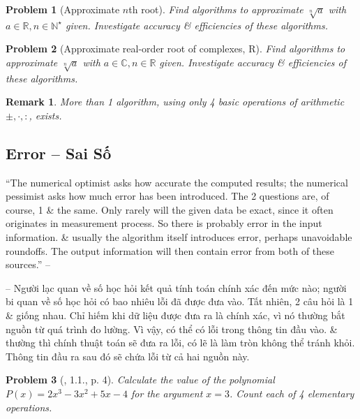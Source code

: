 \documentclass[oneside]{book}
\newtheorem{problem}{Problem}
\newtheorem{remark}{Remark}
\begin{document}
\begin{problem}[Approximate $n$th root]
	Find algorithms to approximate $\sqrt[n]{a}$ with $a\in\mathbb{R},n\in\mathbb{N}^\star$ given. Investigate accuracy \& efficiencies of these algorithms.
\end{problem}

\begin{problem}[Approximate real-order root of complexes, R]
	Find algorithms to approximate $\sqrt[n]{a}$ with $a\in\mathbb{C},n\in\mathbb{R}$ given. Investigate accuracy \& efficiencies of these algorithms.
\end{problem}

\begin{remark}
	More than 1 algorithm, using only 4 basic operations of arithmetic $\pm,\cdot,:$, exists.
\end{remark}


\subsection{Error -- Sai Số}
``The numerical optimist asks how accurate the computed results; the numerical pessimist asks how much error has been introduced. The 2 questions are, of course, 1 \& the same. Only rarely will the given data be exact, since it often originates in measurement process. So there is probably error in the input information. \& usually the algorithm itself introduces error, perhaps unavoidable roundoffs. The output information will then contain error from both of these sources.'' -- \cite[p. 1]{Scheid1989}

-- Người lạc quan về số học hỏi kết quả tính toán chính xác đến mức nào; người bi quan về số học hỏi có bao nhiêu lỗi đã được đưa vào. Tất nhiên, 2 câu hỏi là 1 \& giống nhau. Chỉ hiếm khi dữ liệu được đưa ra là chính xác, vì nó thường bắt nguồn từ quá trình đo lường. Vì vậy, có thể có lỗi trong thông tin đầu vào. \& thường thì chính thuật toán sẽ đưa ra lỗi, có lẽ là làm tròn không thể tránh khỏi. Thông tin đầu ra sau đó sẽ chứa lỗi từ cả hai nguồn này.

\begin{problem}[\cite{Scheid1989}, 1.1., p. 4]
	Calculate the value of the polynomial $P(x) = 2x^3 - 3x^2 + 5x - 4$ for the argument $x = 3$. Count each of 4 elementary operations.
\end{problem}
\end{document}
